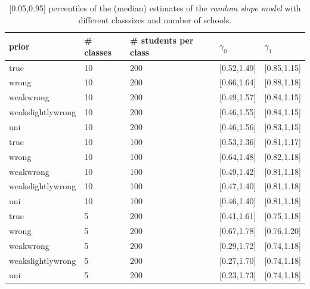 \begin{table}[H]
\begin{center}
\begin{tabular}{l l l l  l}
prior & \# classes & \#  students per class &  $\gamma_0$ & $ \gamma_1$ \\
\hline
true & 10  &  200  &  [0.52,1.49]  &  [0.85,1.15]\\
wrong &10  &  200  &  [0.66,1.64]  &  [0.88,1.18]\\
weakwrong & 10  &  200  &  [0.49,1.57]  &  [0.84,1.15]\\
weakslightlywrong & 10  &  200  &  [0.46,1.55]  &  [0.84,1.15]\\
uni & 10  &  200  &  [0.46,1.56]  &  [0.83,1.15]\\
\hline
true & 10  &  100  &  [0.53,1.36]  &  [0.81,1.17]\\
wrong &10  &  100  &  [0.64,1.48]  &  [0.82,1.18]\\
weakwrong & 10  &  100  &  [0.49,1.42]  &  [0.81,1.18]\\
weakslightlywrong & 10  &  100  &  [0.47,1.40]  &  [0.81,1.18]\\
uni & 10  &  100  &  [0.46,1.40]  &  [0.81,1.18]\\
\hline
true & 5  &  200  &  [0.41,1.61]  &  [0.75,1.18]\\
wrong & 5  &  200  &  [0.67,1.78]  &  [0.76,1.20]\\
weakwrong & 5  &  200  &  [0.29,1.72]  &  [0.74,1.18]\\
weakslightlywrong & 5  &  200  &  [0.27,1.70]  &  [0.74,1.18]\\
uni & 5  &  200  &  [0.23,1.73]  &  [0.74,1.18]\\
\end{tabular}
\end{center}
\caption{ [0.05,0.95] percentiles of the (median) estimates of the  \emph{random slope model}  with different classsizes and number of schools. }
\label{tab:median}
\end{table}

